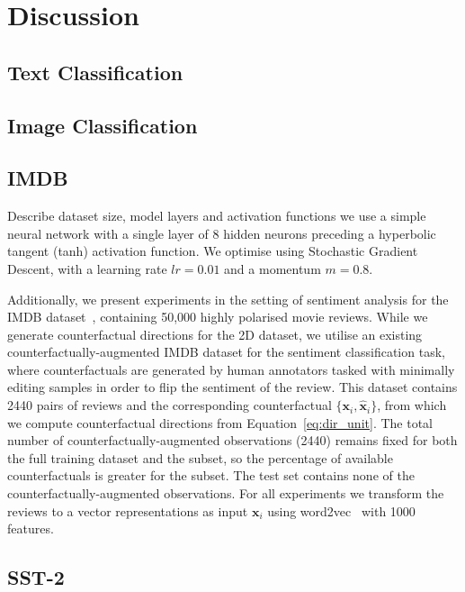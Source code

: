 \documentclass[sigconf,anonymous]{aamas}
\begin{document}
\section{Discussion}
\subsection{Text Classification}

\subsection{Image Classification}


 

\subsection{IMDB}

Describe dataset size, model layers and activation functions
we use a simple neural network with a single layer of 8 hidden neurons preceding a hyperbolic tangent (tanh) activation function. We optimise using Stochastic Gradient Descent, with a learning rate $lr = 0.01$ and a momentum $m=0.8$.


Additionally, we present experiments in the setting of sentiment analysis for the IMDB dataset~\cite{imdb}, containing 50,000 highly polarised movie reviews. While we generate counterfactual directions for the 2D dataset, we utilise an existing counterfactually-augmented IMDB dataset \cite{Kaushik2020Learning} for the sentiment classification task, where counterfactuals are generated by human annotators tasked with minimally editing samples in order to flip the sentiment of the review. This dataset contains 2440 pairs of reviews and the corresponding counterfactual $\{\mathbf{x}_i, \mathbf{\hat{x}}_i\}$, from which we compute counterfactual directions from Equation~\ref{eq:dir_unit}. The total number of counterfactually-augmented observations (2440) remains fixed for both the full training dataset and the subset, so the percentage of available counterfactuals is greater for the subset. The test set contains none of the counterfactually-augmented observations. For all experiments we transform the reviews to a vector representations as input $\mathbf{x}_i$ using word2vec~\cite{word2vec} with 1000 features.

\subsection{SST-2}
\end{document}
